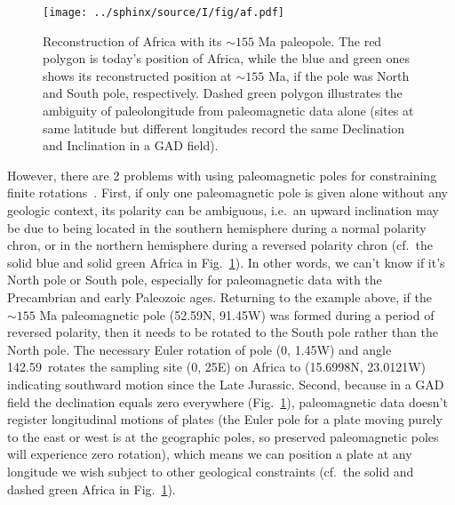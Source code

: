 \begin{figure}
  \centering
    \texttt{[image: ../sphinx/source/I/fig/af.pdf]}
  \captionsetup{width=.95\textwidth}
  \caption[The hemispheric ambiguity and absolute paleolongitude indeterminacy
  with a single paleomagnetic pole (paleopole)]{Reconstruction of Africa with
  its ${\sim}155$ Ma paleopole. The red polygon is today's position of Africa,
  while the blue and green ones shows its reconstructed position at ${\sim}155$
  Ma, if the pole was North and South pole, respectively. Dashed green polygon
  illustrates the ambiguity of paleolongitude from paleomagnetic data alone
  (sites at same latitude but different longitudes record the same Declination
  and Inclination in a GAD field).}\label{Fig:chap_intro_reconstructpole}
\end{figure}

However, there are 2 problems with using paleomagnetic poles for constraining
finite rotations~\citep{T19}. First, if only one paleomagnetic pole is
given alone without any geologic context, its polarity can be ambiguous, i.e.\
an upward inclination may be due to being located in the southern hemisphere
during a normal polarity chron, or in the northern hemisphere during a reversed
polarity chron (cf.\ the solid blue and solid green Africa in Fig.~\ref{Fig:chap_intro_reconstructpole}). In other words, we can't know if it's North pole
or South pole, especially for paleomagnetic data with the Precambrian and early
Paleozoic ages. Returning to the example above, if the ${\sim}155$ Ma
paleomagnetic pole (52.59\degree{}N, 91.45\degree{}W) was formed during a period
of reversed polarity, then it needs to be rotated to the South pole rather than
the North pole. The necessary Euler rotation of pole (0\degree, 1.45\degree{}W)
and angle 142.59\degree\ rotates the sampling site (0\degree, 25\degree{}E) on
Africa to (15.6998\degree{}N, 23.0121\degree{}W) indicating
southward motion since the Late Jurassic. Second, because in a GAD field the
declination equals zero everywhere (Fig.~\ref{Fig:chap_intro_reconstructpole}),
paleomagnetic data doesn't register longitudinal motions of plates (the Euler
pole for a plate moving purely to the east or west is at the geographic poles,
so preserved paleomagnetic poles will experience zero rotation), which means we
can position a plate at any longitude we wish subject to other geological
constraints (cf.\ the solid and dashed green Africa in Fig.~\ref{Fig:chap_intro_reconstructpole}).

